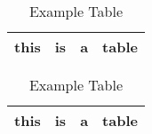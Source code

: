 \begin{table}[!ht]
	\begin{center}
		\label{tble:example}\caption{Example Table}
		\begin{tabular}{|c | c | c | c|}
			\hline
			this & is & a & table \\ \hline
		\end{tabular}
	\end{center}
\end{table}







\lipsum[16-20]

  

\begin{table}[!ht]
	\begin{center}
		\label{tble:example}\caption{Example Table}
		\begin{tabular}{|c | c | c | c|}
			\hline
			this & is & a & table \\ \hline
		\end{tabular}
	\end{center}
\end{table}




